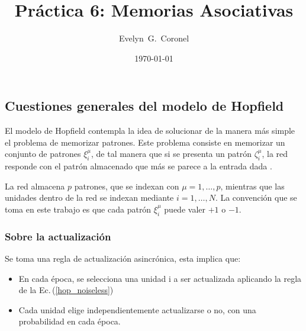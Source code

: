



\title{Práctica 6: Memorias Asociativas}
\author{Evelyn~G.~Coronel}


\date[]{\lowercase{\today}} %


\maketitle
%

\subsection*{Cuestiones generales del modelo  de Hopfield}

El modelo de Hopfield contempla la idea de solucionar de la manera más simple el problema de memorizar patrones. Este problema consiste en memorizar un conjunto de patrones $\xi^\mu _i$, de tal manera que si se presenta un patrón $\zeta^\mu_i$, la red responde con el patrón almacenado que más se parece a la entrada dada \cite{hertz}.

La red almacena $p$ patrones, que se indexan con $\mu=1, \dots, p$, mientras que las unidades dentro de la red se indexan mediante $i=1, \dots, N$. La convención que se toma en este trabajo es que cada patrón $\xi^\mu _i$ puede valer $+1$ o $-1$.
\subsubsection*{Sobre la actualización}

Se toma una regla de actualización asincrónica, esta implica que:

\begin{itemize}
	\item En cada época, se selecciona una unidad i a ser actualizada aplicando la regla de la Ec.\,(\ref{hop_noiseless})
	\item Cada unidad elige independientemente actualizarse o no, con una probabilidad en cada época. 
\end{itemize}

